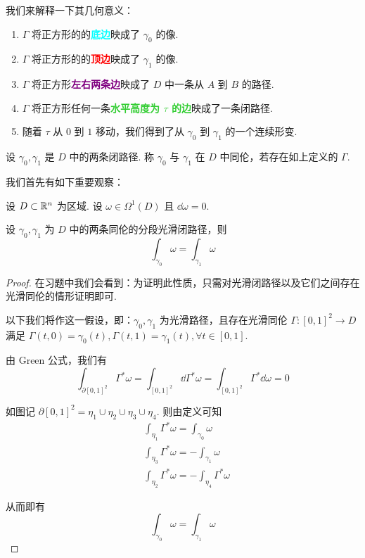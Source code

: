 
我们来解释一下其几何意义：

\begin{enumerate}
    \item $\Gamma$ 将正方形的的\textcolor{Cyan}{\textbf{底边}}映成了 $\gamma_0$ 的像.
    
    \item $\Gamma$ 将正方形的的\textcolor{red}{\textbf{顶边}}映成了 $\gamma_1$ 的像.
    
    \item $\Gamma$ 将正方形\textcolor{Purple}{\textbf{左右两条边}}映成了 $D$ 中一条从 $A$ 到 $B$ 的路径.
    
    \item $\Gamma$ 将正方形任何一条\textcolor{LimeGreen}{\textbf{水平高度为 $\tau$ 的边}}映成了一条闭路径.
    
    \item 随着 $\tau$ 从 $0$ 到 $1$ 移动，我们得到了从 $\gamma_0$ 到 $\gamma_1$ 的一个连续形变.
\end{enumerate}

\begin{definition}
    设 $\gamma_0,\gamma_1$ 是 $D$ 中的两条闭路径. 称 $\gamma_0$ 与 $\gamma_1$ 在 $D$ 中同伦，若存在如上定义的 $\Gamma$.
\end{definition}

我们首先有如下重要观察：

\begin{property}
    设 $D\subset\mathbb{R}^n$ 为区域. 设 $\omega\in\Omega^1(D)$ 且 $\dd\omega=0$.

    设 $\gamma_0,\gamma_1$ 为 $D$ 中的两条同伦的分段光滑闭路径，则
$$
\int_{\gamma_0}\omega=\int_{\gamma_1}\omega
$$
\end{property}
\begin{proof}
    在习题中我们会看到：为证明此性质，只需对光滑闭路径以及它们之间存在光滑同伦的情形证明即可.
    
    以下我们将作这一假设，即：$\gamma_0,\gamma_1$ 为光滑路径，且存在光滑同伦 $\Gamma:[0,1]^2\to D$ 满足 $\Gamma(t,0)=\gamma_0(t),\Gamma(t,1)=\gamma_1(t),\forall t\in[0,1]$.

    由 Green 公式，我们有
$$
\int_{\partial[0,1]^2}\Gamma^*\omega=\int_{[0,1]^2}\dd\Gamma^*\omega=\int_{[0,1]^2}\Gamma^*\dd\omega=0
$$


    如图记 $\partial[0,1]^2=\eta_1\cup\eta_2\cup\eta_3\cup\eta_4$. 则由定义可知
$$
\begin{aligned}
    &\int_{\eta_1}\Gamma^*\omega=\int_{\gamma_0}\omega\\
    &\int_{\eta_3}\Gamma^*\omega=-\int_{\gamma_1}\omega\\
    &\int_{\eta_2}\Gamma^*\omega=-\int_{\eta_4}\Gamma^*\omega
\end{aligned}
$$

    从而即有
$$
\int_{\gamma_0}\omega=\int_{\gamma_1}\omega
$$
\end{proof}

